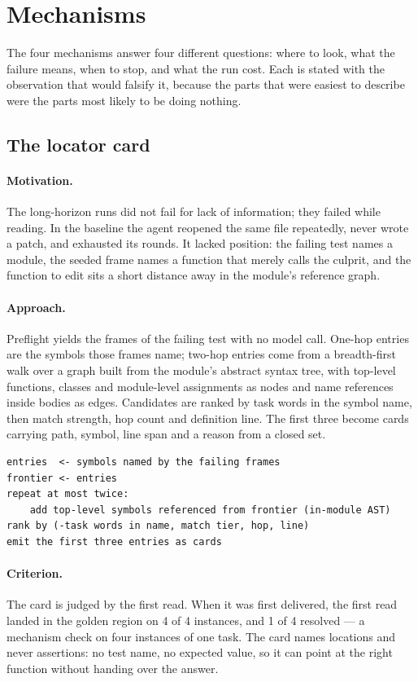 \section{Mechanisms}

The four mechanisms answer four different questions: where to look, what the
failure means, when to stop, and what the run cost. Each is stated with the
observation that would falsify it, because the parts that were easiest to
describe were the parts most likely to be doing nothing.

\subsection{The locator card}
\label{sec:locator}

\paragraph{Motivation.} The long-horizon runs did not fail for lack of
information; they failed while reading. In the baseline the agent reopened the
same file repeatedly, never wrote a patch, and exhausted its rounds. It lacked
position: the failing test names a module, the seeded frame names a function
that merely calls the culprit, and the function to edit sits a short distance
away in the module's reference graph.

\paragraph{Approach.} Preflight yields the frames of the failing test with no
model call. One-hop entries are the symbols those frames name; two-hop entries
come from a breadth-first walk over a graph built from the module's abstract
syntax tree, with top-level functions, classes and module-level assignments as
nodes and name references inside bodies as edges. Candidates are ranked by task
words in the symbol name, then match strength, hop count and definition line.
The first three become cards carrying path, symbol, line span and a reason from
a closed set.

\begin{verbatim}
entries  <- symbols named by the failing frames
frontier <- entries
repeat at most twice:
    add top-level symbols referenced from frontier (in-module AST)
rank by (-task words in name, match tier, hop, line)
emit the first three entries as cards
\end{verbatim}

\paragraph{Criterion.} The card is judged by the first read. When it was first
delivered, the first read landed in the golden region on 4 of 4
instances, and 1 of 4 resolved --- a mechanism check on four instances
of one task. The card names locations and never assertions: no test name, no
expected value, so it can point at the right function without handing over the
answer.

